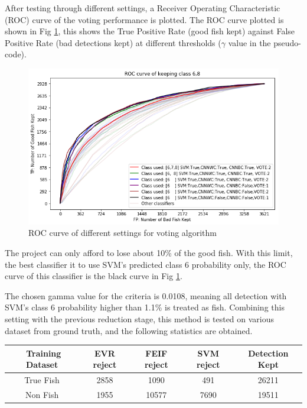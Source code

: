 \documentclass[bsc,logo,twoside,fullspacing,parskip]{infthesis}
\begin{document}
After testing through different settings, a Receiver Operating Characteristic (ROC) curve of the voting performance is plotted.
The ROC curve plotted is shown in Fig \ref{fig:roccurve}, this shows the True Positive Rate (good fish kept) against False Positive Rate (bad detections kept) at different thresholds ($\gamma$ value in the pseudo-code).

\begin{figure}[ht]
\centering
    \includegraphics[scale=0.6]{graph/roccurve.png}
    \caption{ROC curve of different settings for voting algorithm}
    \label{fig:roccurve}
\end{figure} 

The project can only afford to lose about 10\% of the good fish.
With this limit, the best classifier it to use SVM's predicted class 6 probability only, the ROC curve of this classifier is the black curve in Fig \ref{fig:roccurve}. 

The chosen gamma value for the criteria is 0.0108, meaning all detection with SVM's class 6 probability higher than 1.1\% is treated as fish.
Combining this setting with the previous reduction stage, this method is tested on various dataset from ground truth, and the following statistics are obtained.

\begin{center}
\begin{tabular}{|C|C|C|C|C|}
\hline 
$ $ Training Dataset & EVR reject & FEIF reject & SVM reject & Detection Kept\\
\hline 
True Fish & 2858 & 1090 & 491 & 26211 \\
Non Fish & 1955 & 10577 & 7690 & 19511 \\
\hline 
\end{tabular}
\end{center}
\end{document}
